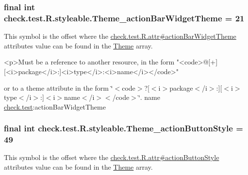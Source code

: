 \subsubsection[{Theme\+\_\+action\+Bar\+Widget\+Theme}]{\setlength{\rightskip}{0pt plus 5cm}final int check.\+test.\+R.\+styleable.\+Theme\+\_\+action\+Bar\+Widget\+Theme = 21\hspace{0.3cm}{\ttfamily [static]}}\label{classcheck_1_1test_1_1_r_1_1styleable_a11aebf359000ff5df5b3cb3760b461ca}
This symbol is the offset where the \hyperlink{classcheck_1_1test_1_1_r_1_1attr_abfe49028f89a795ded936ee9dc2a850b}{check.\+test.\+R.\+attr\#action\+Bar\+Widget\+Theme} attribute\textquotesingle{}s value can be found in the \hyperlink{classcheck_1_1test_1_1_r_1_1styleable_acca726d02016a0cf607782ec3a436a81}{Theme} array.

\begin{DoxyVerb}      <p>Must be a reference to another resource, in the form "<code>@[+][<i>package</i>:]<i>type</i>:<i>name</i></code>"
\end{DoxyVerb}
 or to a theme attribute in the form \char`\"{}$<$code$>$?\mbox{[}$<$i$>$package$<$/i$>$\+:\mbox{]}\mbox{[}$<$i$>$type$<$/i$>$\+:\mbox{]}$<$i$>$name$<$/i$>$$<$/code$>$\char`\"{}.  name \hyperlink{namespacecheck_1_1test}{check.\+test}\+:action\+Bar\+Widget\+Theme \hypertarget{classcheck_1_1test_1_1_r_1_1styleable_a15e83ab3003cd39702fb77872405c667}{}
\subsubsection[{Theme\+\_\+action\+Button\+Style}]{\setlength{\rightskip}{0pt plus 5cm}final int check.\+test.\+R.\+styleable.\+Theme\+\_\+action\+Button\+Style = 49\hspace{0.3cm}{\ttfamily [static]}}\label{classcheck_1_1test_1_1_r_1_1styleable_a15e83ab3003cd39702fb77872405c667}
This symbol is the offset where the \hyperlink{classcheck_1_1test_1_1_r_1_1attr_a3fc78aabb5334c90119bc8f0800b05c3}{check.\+test.\+R.\+attr\#action\+Button\+Style} attribute\textquotesingle{}s value can be found in the \hyperlink{classcheck_1_1test_1_1_r_1_1styleable_acca726d02016a0cf607782ec3a436a81}{Theme} array.

